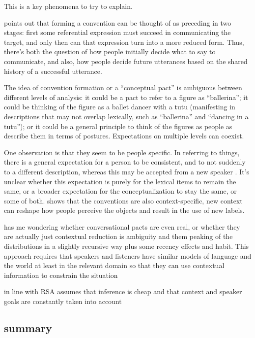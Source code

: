 \documentclass[]{article}
\begin{document}
This is a key phenomena to try to explain. 

\cite{leung2023} points out that forming a convention can be thought of as preceding in two stages: first some referential expression must succeed in communicating the target, and only then can that expression turn into a more reduced form. Thus, there's both the question of how people initially decide what to say to communicate, and also, how people decide future utterances based on the shared history of a successful utterance. 

The idea of convention formation or a ``conceptual pact'' is ambiguous between different levels of analysis: it could be a pact to refer to a figure as ``ballerina''; it could be thinking of the figure as a ballet dancer with a tutu (manifesting in descriptions that may not overlap lexically, such as ``ballerina'' and ``dancing in a tutu''); or it could be a general principle to think of the figures as people as describe them in terms of postures. Expectations on multiple levels can coexist. 


One observation is that they seem to be people specific. In referring to things, there is a general expectation for a person to be consistent, and to not suddenly to a different description, whereas this may be accepted from a new speaker \cite{metzing2003a}. It's unclear whether this expectation is purely for the lexical items to remain the same, or a broader expectation for the conceptualization to stay the same, or some of both. \cite{ibarra2016} shows that the conventions are also context-specific, new context can reshape how people perceive the objects and result in the use of new labels. 


\cite{piantadosi2012} has me wondering whether conversational pacts are even real, or whether they are actually just contextual reduction is ambiguity and them peaking of the distributions in a slightly recursive way plus some recency effects and habit. This approach requires that speakers and listeners have similar models of language and the world at least in the relevant domain so that they can use contextual information to constrain the situation 

\cite{piantadosi2012} in line with RSA assumes that inference is cheap and that context and speaker goals are constantly taken into account 

\subsection{summary}
\end{document}
